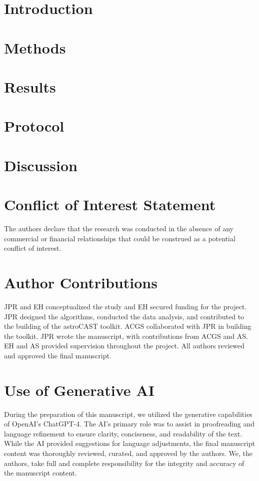 \documentclass[utf8]{FrontiersinHarvard}
\begin{document}
    \section{Introduction}
    


    \section{Methods}
    


    \section{Results}
    


    \section{Protocol}
    


    \section{Discussion}
    

    \section*{Conflict of Interest Statement}
    The authors declare that the research was conducted in the absence of any commercial or financial relationships that could be construed as a potential conflict of interest.

    \section*{Author Contributions}
    JPR and EH conceptualized the study and EH secured funding for the project. JPR designed the algorithms, conducted the data analysis, and contributed to the building of the astroCAST toolkit. ACGS collaborated with JPR in building the toolkit. JPR wrote the manuscript, with contributions from ACGS and AS. EH and AS provided supervision throughout the project. All authors reviewed and approved the final manuscript.

    \section*{Use of Generative AI}
    During the preparation of this manuscript, we utilized the generative capabilities of OpenAI's ChatGPT-4. The AI's primary role was to assist in proofreading and language refinement to ensure clarity, conciseness, and readability of the text. While the AI provided suggestions for language adjustments, the final manuscript content was thoroughly reviewed, curated, and approved by the authors. We, the authors, take full and complete responsibility for the integrity and accuracy of the manuscript content.
\end{document}
